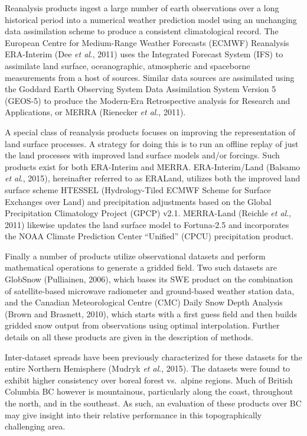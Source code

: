\documentclass[12pt]{article}
\begin{document}
Reanalysis products ingest a large number of earth observations over a long historical period into a numerical weather prediction model using an unchanging data assimilation scheme to produce a consistent climatological record.  The European Centre for Medium-Range Weather Forecasts (ECMWF) Reanalysis ERA-Interim (Dee \textit{et al}., 2011) uses the Integrated Forecast System (IFS) to assimilate land surface, oceanographic, atmospheric and spaceborne measurements from a host of sources.  Similar data sources are assimilated using the Goddard Earth Observing System Data Assimilation System Version 5 (GEOS-5) to produce the Modern-Era Retrospective analysis for Research and Applications, or MERRA (Rienecker \textit{et al}., 2011).  

A special class of reanalysis products focuses on improving the representation of land surface processes.  A strategy for doing this is to run an offline replay of just the land processes with improved land surface models and/or forcings.  Such products exist for both ERA-Interim and MERRA.  ERA-Interim/Land (Balsamo \textit{et al}., 2015), hereinafter referred to as ERALand, utilizes both the improved land surface scheme HTESSEL (Hydrology-Tiled ECMWF Scheme for Surface Exchanges over Land) and precipitation adjustments based on the Global Precipitation Climatology Project (GPCP) v2.1.  MERRA-Land (Reichle \textit{et al}., 2011) likewise updates the land surface model to Fortuna-2.5 and incorporates the NOAA Climate Prediction Center ``Unified'' (CPCU) precipitation product.  

Finally a number of products utilize observational datasets and perform mathematical operations to generate a gridded field.  Two such datasets are GlobSnow (Pulliainen, 2006), which bases its SWE product on the combination of satellite-based microwave radiometer and ground-based weather station data, and the Canadian Meteorological Centre (CMC) Daily Snow Depth Analysis (Brown and Brasnett, 2010), which starts with a first guess field and then builds gridded snow output from observations using optimal interpolation.  Further details on all these products are given in the description of methods.

Inter-dataset spreads have been previously characterized for these datasets for the entire Northern Hemisphere (Mudryk \textit{et al}., 2015).  The datasets were found to exhibit higher consistency over boreal forest vs.\ alpine regions.  Much of British Columbia BC however is mountainous, particularly along the coast, throughout the north, and in the southeast.  As such, an evaluation of these products over BC may give insight into their relative performance in this topographically challenging area.
\end{document}
